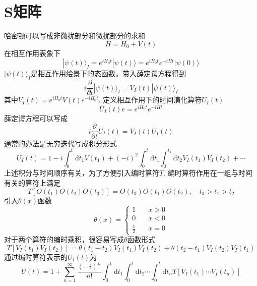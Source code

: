 \documentclass[a4paper,14pt]{article}
\begin{document}
\section{S矩阵}
哈密顿可以写成非微扰部分和微扰部分的求和
\begin{equation*}
    H=H_0+V(t)
\end{equation*}
在相互作用表象下
\begin{equation*}
    |\psi(t)\rangle_{I}=e^{iH_0t}|\psi(t)\rangle=e^{iH_0t}e^{-iHt}|\psi(0)\rangle
\end{equation*}
$|\psi(t)\rangle_I$是相互作用绘景下的态函数。带入薛定谔方程得到
\begin{equation*}
    i\frac{\partial}{\partial t}|\psi(t)\rangle_I=V_I(t)|\psi(t)\rangle_I
\end{equation*}
其中$V_I(t)=e^{iH_0t}V(t)e^{-iH_0t}$. 定义相互作用下的时间演化算符$U_I(t)$
\begin{equation*}
    U_I(t)e=e^{iH_0t}e^{-iHt}
\end{equation*}
薛定谔方程可以写成
\begin{equation*}
    i\frac{\partial}{\partial t}U_I(t)=V_I(t)U_I(t)
\end{equation*}
通常的办法是无穷迭代写成积分形式
\begin{equation*}
    U_I(t)=1-i\int_0^{t}\mathrm{d}t_1V(t_1)+(-i)^2\int_0^t\mathrm{d}t_1\int_0^{t_1}\mathrm{d}t_2V_I(t_1)V_I(t_2)+\cdots
\end{equation*}
上述积分与时间顺序有关，为了方便引入编时算符$T$. 编时算符作用在一组与时间有关的算符上满足
\begin{equation*}
    T[O(t_1)O(t_2)O(t_3)]=O(t_3)O(t_1)O(t_2),\quad t_3>t_1>t_2
\end{equation*}
引入$\theta(x)$函数
\begin{equation*}
    \theta(x)=\begin{cases}
        1\quad &x>0\\
        0\quad &x<0\\
        \frac{1}{2}\quad&x=0
    \end{cases}
\end{equation*}
对于两个算符的编时乘积，很容易写成$\theta$函数形式
\begin{equation*}
    T[V_I(t_1)V_I(t_2)]=\theta(t_1-t_2)V_I(t_1)V_I(t_2)+\theta(t_2-t_1)V_I(t_2)V_I(t_1)
\end{equation*}
通过编时算符表示的$U_I(t)$为
\begin{equation*}
    U(t)=1+\sum_{n=1}^{\infty}\frac{(-i)^n}{n!}\int_0^{t}\mathrm{d}t_1\int_0^t\mathrm{d}t_2\cdots\int_0^t\mathrm{d}t_nT[V_I(t_1)\cdots V_I(t_n)]
\end{equation*}
\end{document}

